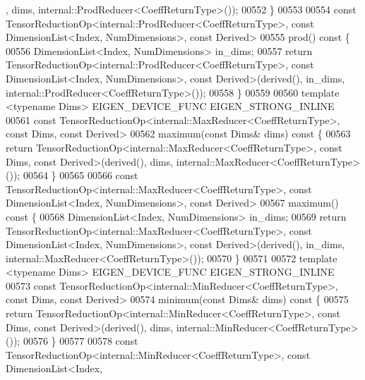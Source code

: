\begin{DoxyCode}
      , dims, internal::ProdReducer<CoeffReturnType>());
00552     \}
00553 
00554     \textcolor{keyword}{const} TensorReductionOp<internal::ProdReducer<CoeffReturnType>, \textcolor{keyword}{const} DimensionList<Index,
       NumDimensions>, \textcolor{keyword}{const} Derived>
00555     prod()\textcolor{keyword}{ const }\{
00556       DimensionList<Index, NumDimensions> in\_dims;
00557       \textcolor{keywordflow}{return} TensorReductionOp<internal::ProdReducer<CoeffReturnType>, \textcolor{keyword}{const} DimensionList<Index,
       NumDimensions>, \textcolor{keyword}{const} Derived>(derived(), in\_dims, internal::ProdReducer<CoeffReturnType>());
00558     \}
00559 
00560     \textcolor{keyword}{template} <\textcolor{keyword}{typename} Dims> EIGEN\_DEVICE\_FUNC EIGEN\_STRONG\_INLINE
00561     \textcolor{keyword}{const} TensorReductionOp<internal::MaxReducer<CoeffReturnType>, \textcolor{keyword}{const} Dims, \textcolor{keyword}{const} Derived>
00562     maximum(\textcolor{keyword}{const} Dims& dims)\textcolor{keyword}{ const }\{
00563       \textcolor{keywordflow}{return} TensorReductionOp<internal::MaxReducer<CoeffReturnType>, \textcolor{keyword}{const} Dims, \textcolor{keyword}{const} Derived>(derived(),
       dims, internal::MaxReducer<CoeffReturnType>());
00564     \}
00565 
00566     \textcolor{keyword}{const} TensorReductionOp<internal::MaxReducer<CoeffReturnType>, \textcolor{keyword}{const} DimensionList<Index,
       NumDimensions>, \textcolor{keyword}{const} Derived>
00567     maximum()\textcolor{keyword}{ const }\{
00568       DimensionList<Index, NumDimensions> in\_dims;
00569       \textcolor{keywordflow}{return} TensorReductionOp<internal::MaxReducer<CoeffReturnType>, \textcolor{keyword}{const} DimensionList<Index,
       NumDimensions>, \textcolor{keyword}{const} Derived>(derived(), in\_dims, internal::MaxReducer<CoeffReturnType>());
00570     \}
00571 
00572     \textcolor{keyword}{template} <\textcolor{keyword}{typename} Dims> EIGEN\_DEVICE\_FUNC EIGEN\_STRONG\_INLINE
00573     \textcolor{keyword}{const} TensorReductionOp<internal::MinReducer<CoeffReturnType>, \textcolor{keyword}{const} Dims, \textcolor{keyword}{const} Derived>
00574     minimum(\textcolor{keyword}{const} Dims& dims)\textcolor{keyword}{ const }\{
00575       \textcolor{keywordflow}{return} TensorReductionOp<internal::MinReducer<CoeffReturnType>, \textcolor{keyword}{const} Dims, \textcolor{keyword}{const} Derived>(derived(),
       dims, internal::MinReducer<CoeffReturnType>());
00576     \}
00577 
00578     \textcolor{keyword}{const} TensorReductionOp<internal::MinReducer<CoeffReturnType>, \textcolor{keyword}{const} DimensionList<Index,

\end{DoxyCode}
